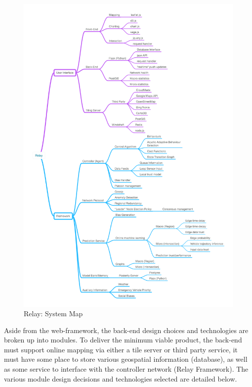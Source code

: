 \documentclass{report}
\begin{document}
\begin{figure}[H]
  \begin{centering}
    \includegraphics[scale=0.3]{figures/flow-chart.png}
    \caption{Relay: System Map}
    \label{fig:Back_end_system_map}
  \end{centering}
\end{figure}

Aside from the web-framework, the back-end design choices and technologies are broken up into modules.
To deliver the minimum viable product, the back-end must support online mapping via either a tile server or third party service, it must have some place to store various geospatial information (database), as well as some service to interface with the controller network (Relay Framework).
The various module design decisions and technologies selected are detailed below.
\end{document}
